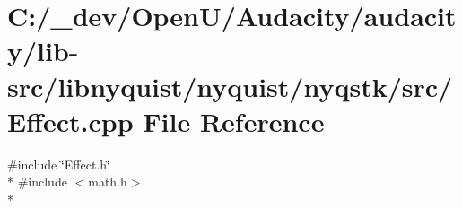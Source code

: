 \hypertarget{lib-src_2libnyquist_2nyquist_2nyqstk_2src_2_effect_8cpp}{}\section{C\+:/\+\_\+dev/\+Open\+U/\+Audacity/audacity/lib-\/src/libnyquist/nyquist/nyqstk/src/\+Effect.cpp File Reference}
\label{lib-src_2libnyquist_2nyquist_2nyqstk_2src_2_effect_8cpp}
{\ttfamily \#include \char`\"{}Effect.\+h\char`\"{}}\\*
{\ttfamily \#include $<$math.\+h$>$}\\*
